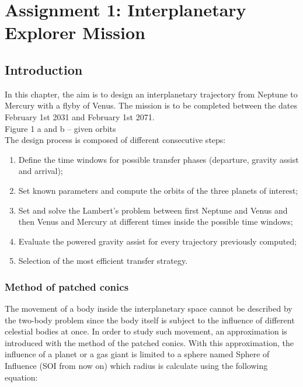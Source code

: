 \documentclass[11pt,a4paper]{report}
\begin{document}
\printnomenclature
\tableofcontents

\part{Assignment 1: Interplanetary Explorer Mission}

\chapter{Introduction}
In this chapter, the aim is to design an interplanetary trajectory from Neptune to Mercury with a flyby of Venus. The mission is to be completed between the dates February 1st 2031 and February 1st 2071.\\
Figure 1 a and b – given orbits\\
The design process is composed of  different consecutive steps:\\
\begin{enumerate}
\item Define the time windows for possible transfer phases (departure, gravity assist and arrival);
\item Set known parameters and compute the orbits of the three planets of interest;
\item Set and solve the Lambert’s problem between first Neptune and Venus and then Venus and Mercury at different times inside the possible time windows;
\item Evaluate the powered gravity assist for every trajectory previously computed;
\item Selection of the most efficient transfer strategy.
\end{enumerate}

\section{Method of patched conics}
The movement of a body inside the interplanetary space cannot be described by the two-body problem since the body itself is subject to the influence of different celestial bodies at once.
In order to study such movement, an approximation is introduced with the method of the patched conics. With this approximation, the influence of a planet or a gas giant is limited to a sphere named Sphere of Influence (SOI from now on) which radius is calculate using the following equation:
\end{document}

